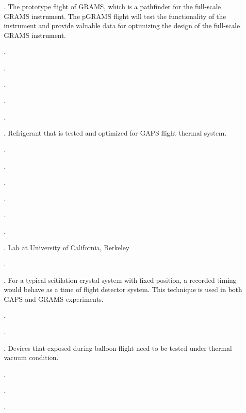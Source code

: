 \begin{acronym}
.
    The prototype flight of GRAMS, which is a pathfinder for the full-scale GRAMS instrument. The pGRAMS flight will test the functionality of the instrument and provide valuable data for optimizing the design of the full-scale GRAMS instrument.

.

.

.

.

.

. Refrigerant that is tested and optimized for GAPS flight thermal system.

.

.

.

.

.

.

. Lab at University of California, Berkeley

.

. For a typical scitilation crystal system with fixed position, a recorded timing would behave as a time of flight detector system. This technique is used in both GAPS and GRAMS experiments.

.

.

. Devices that exposed during balloon flight need to be tested under thermal vacuum condition.

.

.

.

\end{acronym}
